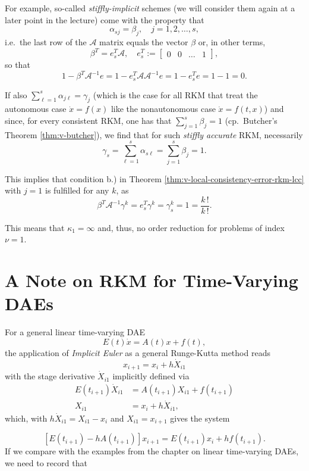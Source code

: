 \documentclass[]{book}
\theoremstyle{definition}
\theoremstyle{definition}
\theoremstyle{definition}
\theoremstyle{definition}
\theoremstyle{remark}
\begin{document}
For example, so-called \emph{stiffly-implicit} schemes (we will consider them again at a later point in the lecture) come with the property that
\[
\alpha_{sj} = \beta_j, \quad j=1,2,\dotsc,s,
\]
i.e.~the last row of the \(\mathcal A\) matrix equals the vector \(\beta\) or, in other terms,
\[
\beta^T = e_s^T\mathcal A, \quad e_s^T:=
\begin{bmatrix}
0& 0& \dots &1
\end{bmatrix},
\]
so that
\[
1-\beta^T\mathcal A^{-1}e= 1-e_s^T\mathcal A\mathcal A^{-1}e = 1-e_s^Te=1-1=0.
\]

If also \(\sum_{\ell=1}^s\alpha_{j\ell}=\gamma_j\) (which is the case for all RKM that treat the autonomous case \(\dot x=f(x)\) like the nonautonomous case \(\dot x=f(t,x)\)) and since, for every consistent RKM, one has that \(\sum_{j=1}^s\beta_j=1\) (cp.~Butcher's Theorem \ref{thm:v-butcher}), we find that for such \emph{stiffly accurate} RKM, necessarily
\begin{equation}
\gamma_s =\sum_{\ell=1}^s\alpha_{s\ell} = \sum_{j=1}^s\beta_j=1.
\end{equation}

This implies that condition b.) in Theorem \ref{thm:v-local-consistency-error-rkm-lcc} with \(j=1\) is fulfilled for any \(k\), as
\[
\beta^T\mathcal A^{-1}\gamma^k = e_s^T\gamma^k = \gamma_s^k = 1 = \frac{k\,!}{k\,!}.
\]

This means that \(\kappa_1=\infty\) and, thus, no order reduction for problems of index \(\nu=1\).

\hypertarget{a-note-on-rkm-for-time-varying-daes}{%
\section{A Note on RKM for Time-Varying DAEs}\label{a-note-on-rkm-for-time-varying-daes}}

For a general linear time-varying DAE
\[
E(t)\dot x = A(t)x +f(t),
\]
the application of \emph{Implicit Euler} as a general Runge-Kutta method reads
\[
x_{i+1} = x_i + h\dot X_{i1}
\]
with the stage derivative \(\dot X_{i1}\) implicitly defined via
\begin{align}
E(t_{i+1})\dot X_{i1} &= A(t_{i+1})X_{i1} + f(t_{i+1}) \\
X_{i1} &= x_i + h \dot X_{i1},
\end{align}
which, with \(h \dot X_{i1}=X_{i1}-x_i\) and \(X_{i1}=x_{i+1}\) gives the system

\[
[E(t_{i+1})-hA(t_{i+1})]x_{i+1} = E(t_{i+1})x_i + hf(t_{i+1}).
\]
If we compare with the examples from the chapter on linear time-varying DAEs, we need to record that
\end{document}
